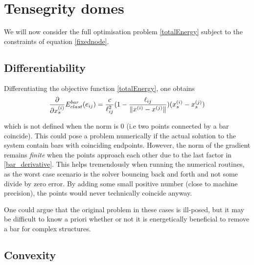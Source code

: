 \section{Tensegrity domes}
We will now consider the full optimisation problem \eqref{totalEnergy} subject to the constraints of equation \ref{fixednode}.

\subsection{Differentiability}
Differentiating the objective function \eqref{totalEnergy}, one obtains
\begin{equation}
\frac{\partial}{\partial x_s^{(i)}} E^{bar}_{elast}(e_{ij}) = \frac{c}{\ell_{ij}^2} (1- \frac{\ell_{ij}}{\lVert x^{(i)} - x^{(j)}\rVert}) (x_s^{(i)} - x_s^{(j)})
\label{bar_derivative}
\end{equation}

which is not defined when the norm is $0$ (i.e two points connected by a bar coincide). This could pose a problem numerically if the actual solution to the system contain bars with coinciding endpoints. However, the norm of the gradient remains \emph{finite} when the points approach each other due to the last factor in \eqref{bar_derivative}. This helps tremendously when running the numerical routines, as the worst case scenario is the solver bouncing back and forth and not some divide by zero error. By adding some small positive number (close to machine precision), the points would never technically coincide anyway.

One could argue that the original problem in these cases is ill-posed, but it may be difficult to know a priori whether or not it is energetically beneficial to remove a bar for complex structures. 

\subsection{Convexity}

